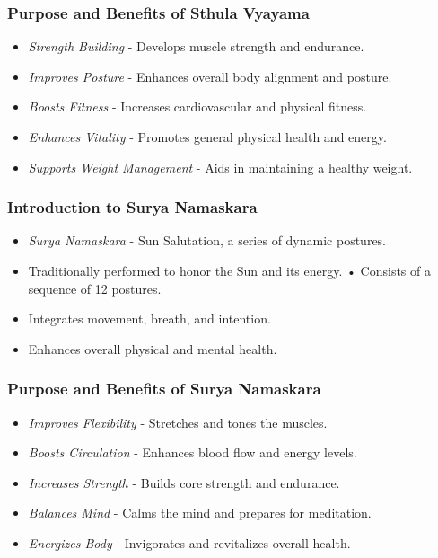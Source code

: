\begin{frame}[fragile]\frametitle{Purpose and Benefits of Sthula Vyayama}

      \begin{itemize}
		\item \textit{Strength Building} - Develops muscle strength and endurance.
		\item \textit{Improves Posture} - Enhances overall body alignment and posture.
		\item \textit{Boosts Fitness} - Increases cardiovascular and physical fitness.
		\item \textit{Enhances Vitality} - Promotes general physical health and energy.
		\item \textit{Supports Weight Management} - Aids in maintaining a healthy weight.
	  \end{itemize}

\end{frame}

\begin{frame}[fragile]\frametitle{Introduction to Surya Namaskara}

      \begin{itemize}
		\item \textit{Surya Namaskara} - Sun Salutation, a series of dynamic postures.
		\item Traditionally performed to honor the Sun and its energy.
		• Consists of a sequence of 12 postures.
		\item Integrates movement, breath, and intention.
		\item Enhances overall physical and mental health.
	  \end{itemize}

\end{frame}

\begin{frame}[fragile]\frametitle{Purpose and Benefits of Surya Namaskara}

      \begin{itemize}
		\item \textit{Improves Flexibility} - Stretches and tones the muscles.
		\item \textit{Boosts Circulation} - Enhances blood flow and energy levels.
		\item \textit{Increases Strength} - Builds core strength and endurance.
		\item \textit{Balances Mind} - Calms the mind and prepares for meditation.
		\item \textit{Energizes Body} - Invigorates and revitalizes overall health.
	  \end{itemize}

\end{frame}


